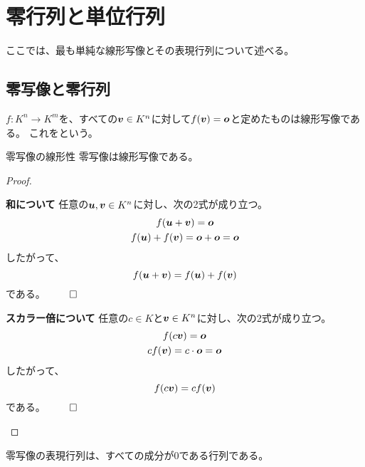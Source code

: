\documentclass[../../../topic_linear-algebra]{subfiles}
\begin{document}
\sectionline
\section{零行列と単位行列}

ここでは、最も単純な線形写像とその表現行列について述べる。

\subsection{零写像と零行列}

$f\colon K^n \to K^m$を、すべての$\vb*{v} \in K^n$に対して$f(\vb*{v}) = \vb*{o}$と定めたものは線形写像である。
これをという。

\begin{theorem*}{零写像の線形性}
  零写像は線形写像である。
\end{theorem*}

\begin{proof}
  \begin{subpattern}{\bfseries 和について}
    任意の$\vb*{u},\vb*{v}\in K^n$に対し、次の2式が成り立つ。
    \begin{gather*}
      f(\vb*{u}+\vb*{v})=\vb*{o} \\
      f(\vb*{u})+f(\vb*{v})=\vb*{o}+\vb*{o}=\vb*{o}
    \end{gather*}
    したがって、
    \begin{equation*}
      f(\vb*{u}+\vb*{v})=f(\vb*{u})+f(\vb*{v})
    \end{equation*}
    である。 $\qed$
  \end{subpattern}
  
  \begin{subpattern}{\bfseries スカラー倍について}
    任意の$c \in K$と$\vb*{v}\in K^n$に対し、次の2式が成り立つ。
    \begin{gather*}
      f(c\vb*{v})=\vb*{o} \\
      c f(\vb*{v})=c \cdot \vb*{o}=\vb*{o}
    \end{gather*}
    したがって、
    \begin{equation*}
      f(c\vb*{v})=c f(\vb*{v})
    \end{equation*}
    である。 $\qed$
  \end{subpattern}
\end{proof}

\br

零写像の表現行列は、すべての成分が0である行列である。
\end{document}
